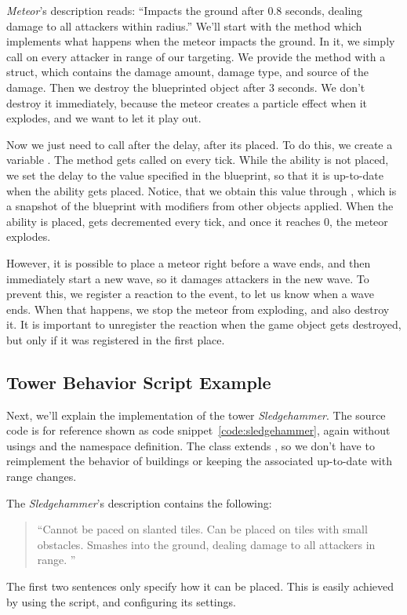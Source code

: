 \emph{Meteor}'s description reads: \enquote{Impacts the ground after 0.8 seconds, dealing damage to all attackers within radius.}
We'll start with the method  which implements what happens when the meteor impacts the ground.
In it, we simply call  on every attacker in range of our targeting.
We provide the method with a  struct, which contains the damage amount, damage type, and source of the damage.
Then we destroy the blueprinted object after 3 seconds.
We don't destroy it immediately, because the meteor creates a particle effect when it explodes, and we want to let it play out.

Now we just need to call  after the delay, after its placed.
To do this, we create a variable .
The method  gets called on every tick.
While the ability is not placed, we set the delay to the value specified in the blueprint, so that it is up-to-date when the ability gets placed.
Notice, that we obtain this value through , which is a snapshot of the blueprint with modifiers from other objects applied.
When the ability is placed,  gets decremented every tick, and once it reaches 0, the meteor explodes.

However, it is possible to place a meteor right before a wave ends, and then immediately start a new wave, so it damages attackers in the new wave.
To prevent this, we register a reaction to the  event, to let us know when a wave ends.
When that happens, we stop the meteor from exploding, and also destroy it.
It is important to unregister the reaction when the game object gets destroyed, but only if it was registered in the first place.

\subsection{Tower Behavior Script Example}
Next, we'll explain the implementation of the tower \emph{Sledgehammer}.
The source code is for reference shown as code snippet~\ref{code:sledgehammer}, again without usings and the namespace definition.
The  class extends , so we don't have to reimplement the behavior of buildings or keeping the associated  up-to-date with range changes.

The \emph{Sledgehammer}'s description contains the following:
\begin{quotation}
    \enquote{Cannot be paced on slanted tiles.
        Can be placed on tiles with small obstacles.
        Smashes into the ground, dealing damage to all attackers in range.    }
\end{quotation}
The first two sentences only specify how it can be placed.
This is easily achieved by using the  script, and configuring its settings.

